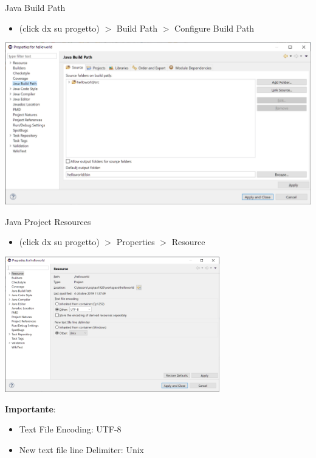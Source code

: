 \documentclass[presentation]{beamer}
\begin{document}
\begin{frame}{Java Build Path}
\begin{itemize}
\item (click dx su progetto) $>$ Build Path $>$ Configure Build Path
\end{itemize}
\begin{center}
\includegraphics[width=\textwidth]{img/eclipse-screenshots/eclipse-ide-05a.png}
\end{center}
\end{frame}

\begin{frame}{Java Project Resources}
\begin{itemize}
\item (click dx su progetto) $>$ Properties $>$ Resource
\end{itemize}
\begin{center}
\includegraphics[width=0.7\textwidth]{img/eclipse-screenshots/eclipse-ide-05b.png}
\end{center}
\textbf{Importante}:
\begin{itemize}
\item Text File Encoding: UTF-8
\item New text file line Delimiter: Unix
\end{itemize}
\end{frame}
\end{document}

